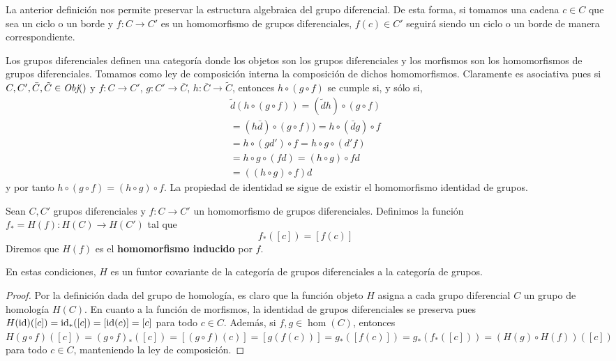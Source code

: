 La anterior definición nos permite preservar la estructura algebraica del grupo diferencial. De esta forma, si tomamos una cadena $c \in C$ que sea un ciclo o un borde y $f:C \rightarrow C'$ es un homomorfismo de grupos diferenciales, $f(c) \in C'$ seguirá siendo un ciclo o un borde de manera correspondiente.

Los grupos diferenciales definen una categoría donde los objetos son los grupos diferenciales y los morfismos son los homomorfismos de grupos diferenciales. Tomamos como ley de composición interna la composición de dichos homomorfismos. Claramente es asociativa pues si $C,C',\bar{C}, \tilde{C} \in \operatorname{\textit{Obj}}()$ y $f: C \to C'$, $g: C' \to \bar{C}$, $h: \bar{C} \to \tilde{C}$, entonces $h \circ (g \circ f)$ se cumple si, y sólo si,
\begin{gather*}
	\tilde{d}(h \circ (g \circ f)) 
	= (\tilde{d}h) \circ (g \circ f) \\
	=(h\bar{d}) \circ (g \circ f)) 
	=h \circ (\bar{d} g) \circ f \\
	=h \circ (g d') \circ f
	=h \circ g \circ (d' f) \\
	=h \circ g \circ (fd)
	=(h \circ g) \circ fd \\
	=((h \circ g) \circ f) d
\end{gather*}
y por tanto $h \circ (g \circ f) = (h \circ g) \circ f$. La propiedad de identidad se sigue de existir el homomorfismo identidad de grupos.
\begin{definicion}
	Sean $C, C'$ grupos diferenciales y $f:C \rightarrow C'$ un homomorfismo de grupos diferenciales. Definimos la función $f_* = H(f): H(C) \rightarrow H(C')$ tal que 
	\[f_*([c]) = [f(c)] \]
	Diremos que $H(f)$ es el \textbf{homomorfismo inducido} por $f$.
\end{definicion}
\begin{proposicion}
	En estas condiciones, $H$ es un funtor covariante de la categoría de grupos diferenciales a la categoría de grupos.
\end{proposicion}
\begin{proof}
	Por la definición dada del grupo de homología, es claro que la función objeto $H$ asigna a cada grupo diferencial $C$ un grupo de homología $H(C)$. En cuanto a la función de morfismos, la identidad de grupos diferenciales se preserva pues $H(\operatorname{id})([c]) = \operatorname{id}_*([c]) = [\operatorname{id}(c)] = [c]$ para todo $c \in C$. Además, si $f,g \in \hom(C)$, entonces $H(g \circ f)([c]) = (g \circ f)_*([c]) = [(g \circ f)(c)] = [g (f (c))] = g_*([f(c)]) = g_* ( f_*([c])) = (H(g) \circ H(f)) ([c])$ para todo $c \in C$, manteniendo la ley de composición.
\end{proof}

